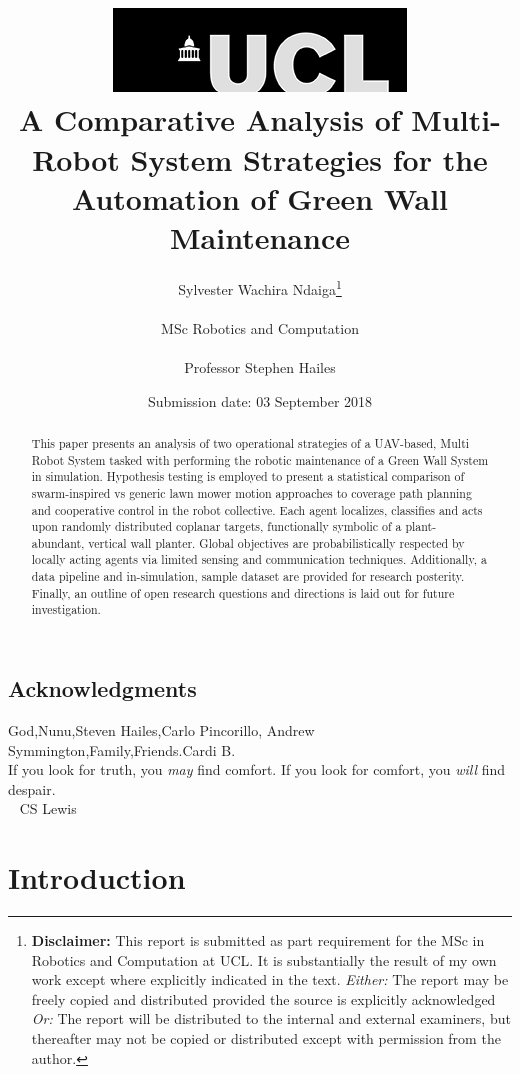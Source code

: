 \documentclass{report}
\title{  	{ \includegraphics[scale=.5]{ucl_logo.png} }\\
{{\Huge A Comparative Analysis of Multi-Robot System Strategies for the Automation of Green Wall Maintenance} }\\
	  }
\date{Submission date: 03 September 2018}
\author{Sylvester Wachira Ndaiga\thanks{
{\bf Disclaimer:}
This report is submitted as part requirement for the MSc in Robotics and Computation at UCL. It is
substantially the result of my own work except where explicitly indicated in the text.
\emph{Either:} The report may be freely copied and distributed provided the source is explicitly acknowledged
\newline  %
\emph{Or:}\newline
The report will be distributed to the internal and external examiners, but thereafter may not be copied or distributed except with permission from the author.}
\\ \\
MSc Robotics and Computation\\ \\
Professor Stephen Hailes}
\begin{document}
 
\onehalfspacing
\maketitle
\begin{abstract}

This paper presents an analysis of two operational strategies of a UAV-based, Multi Robot System tasked with performing the robotic maintenance of a Green Wall System in simulation. Hypothesis testing is employed to present a statistical comparison of swarm-inspired vs generic lawn mower motion approaches to coverage path planning and cooperative control in the robot collective. Each agent localizes, classifies and acts upon randomly distributed coplanar targets, functionally symbolic of a plant-abundant, vertical wall planter. Global objectives are probabilistically respected by locally acting agents via limited sensing and communication techniques. Additionally, a data pipeline and in-simulation, sample dataset are provided for research posterity. Finally, an outline of open research questions and directions is laid out for future investigation.

\end{abstract}
\tableofcontents
\setcounter{page}{1}

\newpage
\section*{Acknowledgments}
God,Nunu,Steven Hailes,Carlo Pincorillo, Andrew Symmington,Family,Friends.Cardi B.
\vspace{5cm}
\\
If you look for truth, you \textit{may} find comfort.
If you look for comfort, you \textit{will} find despair.
\\
~ CS Lewis

\chapter{Introduction}
\end{document}
